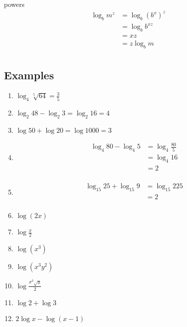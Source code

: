 \documentclass{exam}
\begin{document}
  powers
  \begin{align*}
    \log_b m^z &= \log_b \left( b^x \right)^z \\
               &= \log_b b^{xz} \\
               &= xz \\
               &= z \log_b m \\
  \end{align*}

  \subsection{Examples}

  \begin{enumerate}
    \item $\log_4 \sqrt[5]{64} = \frac{3}{5}$

    \item $\log_2 48 - \log_2 3 = \log_2 16 = 4$

    \item $\log 50 + \log 20 = \log 1000 = 3$

    \item 
      \begin{align*}
        \log_4 80 - \log_4 5 &= \log_4 \frac{80}{5} \\
                             &= \log_4 16 \\
                             &= 2 \\
      \end{align*}

    \item
      \begin{align*}
        \log_{15} 25 + \log_{15} 9 &= \log_{15} 225 \\
                                   &= 2 \\
      \end{align*}

    \item $\log(2x)$

    \item $\log \frac{x}{2}$

    \item $\log(x^3)$

    \item $\log(x^3 y^2)$

    \item $\log \frac{x^3 \sqrt{y}}{2}$

    \item $\log 2 + \log 3$

    \item $2 \log x - \log (x - 1)$

  \end{enumerate}
\end{document}

